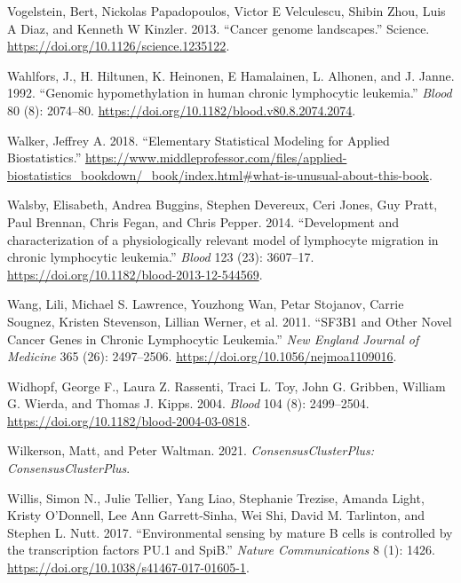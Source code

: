 \documentclass[11pt, a4paper, twosided]{book}
\newenvironment{CSLReferences}%
  {}%
  {\par}
\begin{document}
\begin{CSLReferences}{1}{0}
\leavevmode{}%
Vogelstein, Bert, Nickolas Papadopoulos, Victor E Velculescu, Shibin Zhou, Luis A Diaz, and Kenneth W Kinzler. 2013. {``{Cancer genome landscapes}.''} Science. \url{https://doi.org/10.1126/science.1235122}.

\leavevmode{}%
Wahlfors, J., H. Hiltunen, K. Heinonen, E Hamalainen, L. Alhonen, and J. Janne. 1992. {``{Genomic hypomethylation in human chronic lymphocytic leukemia}.''} \emph{Blood} 80 (8): 2074--80. \url{https://doi.org/10.1182/blood.v80.8.2074.2074}.

\leavevmode{}%
Walker, Jeffrey A. 2018. {``{Elementary Statistical Modeling for Applied Biostatistics}.''} \url{https://www.middleprofessor.com/files/applied-biostatistics_bookdown/_book/index.html\#what-is-unusual-about-this-book}.

\leavevmode{}%
Walsby, Elisabeth, Andrea Buggins, Stephen Devereux, Ceri Jones, Guy Pratt, Paul Brennan, Chris Fegan, and Chris Pepper. 2014. {``{Development and characterization of a physiologically relevant model of lymphocyte migration in chronic lymphocytic leukemia}.''} \emph{Blood} 123 (23): 3607--17. \url{https://doi.org/10.1182/blood-2013-12-544569}.

\leavevmode{}%
Wang, Lili, Michael S. Lawrence, Youzhong Wan, Petar Stojanov, Carrie Sougnez, Kristen Stevenson, Lillian Werner, et al. 2011. {``{SF3B1 and Other Novel Cancer Genes in Chronic Lymphocytic Leukemia}.''} \emph{New England Journal of Medicine} 365 (26): 2497--2506. \url{https://doi.org/10.1056/nejmoa1109016}.

\leavevmode{}%
Widhopf, George F., Laura Z. Rassenti, Traci L. Toy, John G. Gribben, William G. Wierda, and Thomas J. Kipps. 2004. \emph{Blood} 104 (8): 2499--2504. \url{https://doi.org/10.1182/blood-2004-03-0818}.

\leavevmode{}%
Wilkerson, Matt, and Peter Waltman. 2021. \emph{ConsensusClusterPlus: ConsensusClusterPlus}.

\leavevmode{}%
Willis, Simon N., Julie Tellier, Yang Liao, Stephanie Trezise, Amanda Light, Kristy O'Donnell, Lee Ann Garrett-Sinha, Wei Shi, David M. Tarlinton, and Stephen L. Nutt. 2017. {``{Environmental sensing by mature B cells is controlled by the transcription factors PU.1 and SpiB}.''} \emph{Nature Communications} 8 (1): 1426. \url{https://doi.org/10.1038/s41467-017-01605-1}.


\end{CSLReferences}
\end{document}
